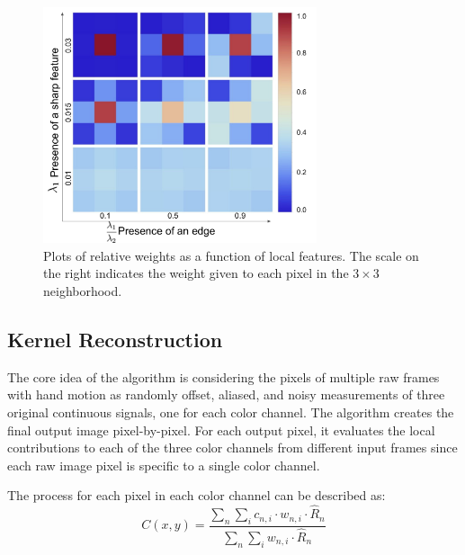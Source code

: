 \documentclass{sig-alternate}
\begin{document}
\begin{figure}
\centering
\includegraphics[width=19pc]{figures/Wronski2019-figure-8.pdf}
\caption{Plots of relative weights as a function of local features. The scale on the right indicates the weight given to each pixel in the $3\times 3$ neighborhood.~\cite{Wronski2019}}
\label{fig:Wronski2019Fig8}
\end{figure}

\pagebreak

\subsection{Kernel Reconstruction}
\label{sec:kernelReconstruction}



The core idea of the algorithm is considering the pixels of multiple raw frames with hand motion as randomly offset, aliased, and noisy measurements of three original continuous signals, one for each color channel. The algorithm creates the final output image pixel-by-pixel. For each output pixel, it evaluates the local contributions to each of the three color channels from different input frames since each raw image pixel is specific to a single color channel. 

The process for each pixel in each color channel can be described as:
\begin{equation*}
C(x, y)=\frac{\sum_{n} \sum_{i} c_{n, i} \cdot w_{n, i} \cdot \hat{R}_{n}}{\sum_{n} \sum_{i} w_{n, i} \cdot \hat{R}_{n}}
\end{equation*}
\end{document}
